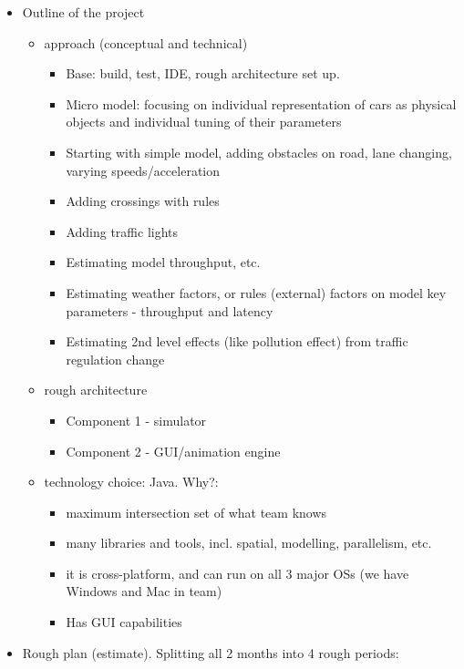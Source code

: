 \begin{itemize}
	\item Outline of the project
	\begin{itemize}
		\item approach (conceptual and technical)
		\begin{itemize}
		    \item Base: build, test, IDE, rough architecture set up.
		    \item Micro model: focusing on individual representation of cars as physical objects and individual tuning of their parameters
		    \item Starting with simple model, adding obstacles on road, lane changing, varying speeds/acceleration
		    \item Adding crossings with rules
		    \item Adding traffic lights
		    \item Estimating model throughput, etc.
		    \item Estimating weather factors, or rules (external) factors on model key parameters - throughput and latency
		    \item Estimating 2nd level effects (like pollution effect) from traffic regulation change
		\end{itemize}

		\item rough architecture
		\begin{itemize}
		    \item Component 1 - simulator
		    \item Component 2 - GUI/animation engine
		\end{itemize}

		\item technology choice: Java. Why?:
		\begin{itemize}
		    \item maximum intersection set of what team knows
		    \item many libraries and tools, incl. spatial, modelling, parallelism, etc.
		    \item it is cross-platform, and can run on all 3 major OSs (we have Windows and Mac in team)
		    \item Has GUI capabilities
		\end{itemize}

	\end{itemize}

	\item Rough plan (estimate). Splitting all 2 months into 4 rough periods:
	\begin{itemize}


\end{itemize}
\end{itemize}
